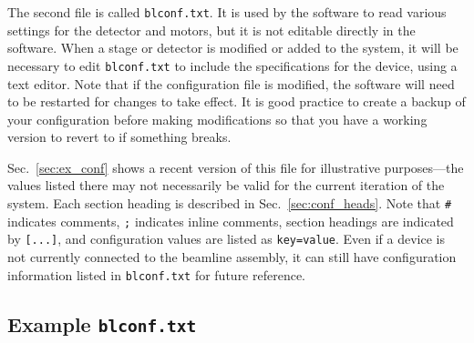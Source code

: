 The second file is called \texttt{blconf.txt}. It is used by the software to
read various settings for the detector and motors, but it is not editable
directly in the software. When a stage or detector is modified or added to the
system, it will be necessary to edit \texttt{blconf.txt} to include the
specifications for the device, using a text editor. Note that if the
configuration file is modified, the software will need to be restarted for
changes to take effect. It is good practice to create a backup of your
configuration before making modifications so that you have a working version to
revert to if something breaks.

Sec.~\ref{sec:ex_conf} shows a recent version of this file for illustrative
purposes---the values listed there may not necessarily be valid for the current
iteration of the system. Each section heading is described in
Sec.~\ref{sec:conf_heads}. Note that \texttt{\#} indicates comments, \texttt{;}
indicates inline comments, section headings are indicated by \verb|[...]|, and
configuration values are listed as \verb|key=value|. Even if a device is not
currently connected to the beamline assembly, it can still have configuration
information listed in \texttt{blconf.txt} for future reference.

\subsection{Example \texttt{blconf.txt} \label{sec:ex_conf}}

